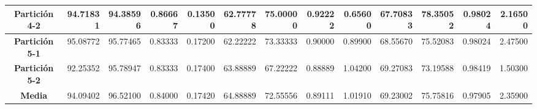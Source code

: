 \documentclass[a4paper,11pt]{article}
\begin{document}
\begin{table}[H]
\begin{adjustbox}{width=1.1\textwidth}
\begin{tabular}{|c|r|r|r|r|r|r|r|r|r|r|r|r|}
    \textbf{Partición 4-2} & 94.71831 & 94.38596 & 0.86667 & 0.13500 & 62.77778 & 75.00000 & 0.92222 & 0.65600 & 67.70833 & 78.35052 & 0.98024 & 2.16500 \\ \hline
    \textbf{Partición 5-1} & 95.08772 & 95.77465 & 0.83333 & 0.17200 & 62.22222 & 73.33333 & 0.90000 & 0.89900 & 68.55670 & 75.52083 & 0.98024 & 2.47500 \\ \hline
    \textbf{Partición 5-2} & 92.25352 & 95.78947 & 0.83333 & 0.17400 & 63.88889 & 67.22222 & 0.88889 & 1.04200 & 69.27083 & 73.19588 & 0.98419 & 1.50300 \\ \hline
    \textbf{Media} & 94.09402 & 96.52100 & 0.84000 & 0.17420 & 64.88889 & 72.55556 & 0.89111 & 1.01910 & 69.23002 & 75.75816 & 0.97905 & 2.35900 \\ \hline
    \end{tabular}
    \end{adjustbox}
    \label{SFS}
  \end{table}
\end{document}

